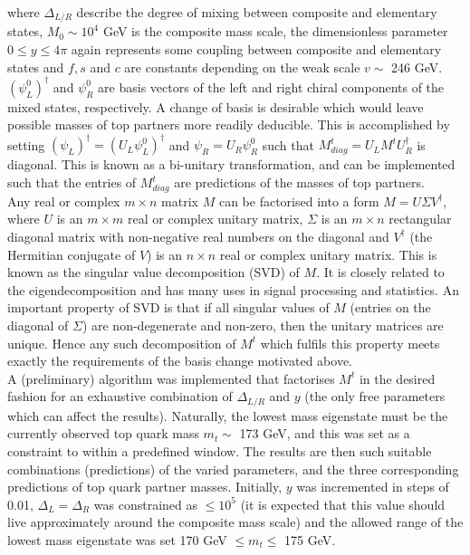 \documentclass[a4paper]{article}
\begin{document}
\hfill\break
where \(\Delta_{L/R}\) describe the degree of mixing between composite and elementary states, \(M_{0} \sim 10^{4}\) GeV is the composite mass scale, the dimensionless parameter \(0 \leq y \leq 4\pi\) again represents some coupling between composite and elementary states and \(f,s\) and \(c\) are constants depending on the weak scale \(v \sim\) 246 GeV. \(\left(\psi_{L}^0\right)^\dag\) and \(\psi_{R}^0\) are basis vectors of the left and right chiral components of the mixed states, respectively. A change of basis is desirable which would leave possible masses of top partners more readily deducible. This is accomplished by setting \(\left(\psi_{L}\right)^\dag = \left(U_{L}\psi_{L}^{0}\right)^\dag\) and \(\psi_{R} = U_{R}\psi_{R}^{0}\) such that \(M_{diag}^{t} = U_{L}M^{t}U_{R}^\dag\) is diagonal. This is known as a bi-unitary transformation, and can be implemented such that the entries of \(M_{diag}^{t}\) are predictions of the masses of top partners. \\
\hfill\break
Any real or complex \(m \times n\) matrix \(M\) can be factorised into a form \(M = U\Sigma V^\dag\), where \(U\) is an \(m \times m\) real or complex unitary matrix, \(\Sigma\) is an \(m \times n\) rectangular diagonal matrix with non-negative real numbers on the diagonal and \(V^\dag\) (the Hermitian conjugate of \(V\)) is an \(n \times n\) real or complex unitary matrix. This is known as the singular value decomposition (SVD) of \(M\). It is closely related to the eigendecomposition and has many uses in signal processing and statistics. An important property of SVD is that if all singular values of \(M\) (entries on the diagonal of \(\Sigma\)) are non-degenerate and non-zero, then the unitary matrices are unique. Hence any such decomposition of \(M^{t}\) which fulfils this property meets exactly the requirements of the basis change motivated above. \\
\hfill\break
A (preliminary) algorithm was implemented that factorises \(M^{t}\) in the desired fashion for an exhaustive combination of \(\Delta_{L/R}\) and \(y\) (the only free parameters which can affect the results). Naturally, the lowest mass eigenstate must be the currently observed top quark mass \(m_{t} \sim\) 173 GeV, and this was set as a constraint to within a predefined window. The results are then such suitable combinations (predictions) of the varied parameters, and the three corresponding predictions of top quark partner masses. Initially, \(y\) was incremented in steps of 0.01, \(\Delta_{L} = \Delta_{R}\) was constrained as \(\leq10^5\) (it is expected that this value should live approximately around the composite mass scale) and the allowed range of the lowest mass eigenstate was set 170 GeV \(\leq m_{t} \leq\) 175 GeV. \\
\end{document}
